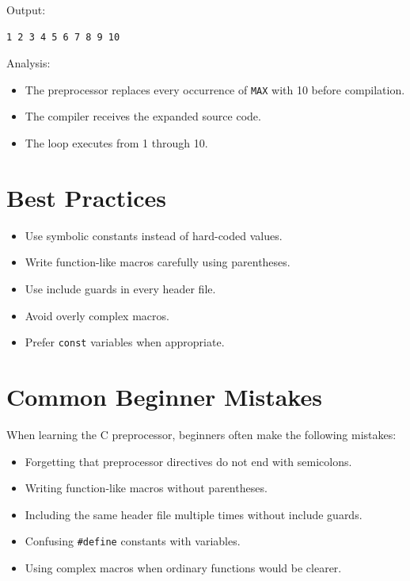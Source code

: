 \documentclass[12pt,openany]{book}
\begin{document}
Output:

\begin{lstlisting}
1 2 3 4 5 6 7 8 9 10
\end{lstlisting}

Analysis:

\begin{itemize}
    \item The preprocessor replaces every occurrence of \texttt{MAX} with 10 before compilation.
    \item The compiler receives the expanded source code.
    \item The loop executes from 1 through 10.
\end{itemize}

\section{Best Practices}

\begin{itemize}
    \item Use symbolic constants instead of hard-coded values.
    \item Write function-like macros carefully using parentheses.
    \item Use include guards in every header file.
    \item Avoid overly complex macros.
    \item Prefer \texttt{const} variables when appropriate.
\end{itemize}
\section{Common Beginner Mistakes}

When learning the C preprocessor, beginners often make the following mistakes:

\begin{itemize}
    \item Forgetting that preprocessor directives do not end with semicolons.
    \item Writing function-like macros without parentheses.
    \item Including the same header file multiple times without include guards.
    \item Confusing \texttt{\#define} constants with variables.
    \item Using complex macros when ordinary functions would be clearer.
\end{itemize}
\end{document}
